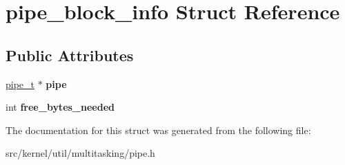 \hypertarget{structpipe__block__info}{}\section{pipe\+\_\+block\+\_\+info Struct Reference}
\label{structpipe__block__info}
\subsection*{Public Attributes}
\begin{DoxyCompactItemize}
\item 
\mbox{\label{structpipe__block__info_a57bc2c6f64fe12c09e9d4c0daa654d6b}} 
\hyperlink{structpipe__t}{pipe\+\_\+t} $\ast$ {\bfseries pipe}
\item 
\mbox{\label{structpipe__block__info_ad99dc801b1c3b09dd2b09ced9fe5f5f2}} 
int {\bfseries free\+\_\+bytes\+\_\+needed}
\end{DoxyCompactItemize}


The documentation for this struct was generated from the following file\+:\begin{DoxyCompactItemize}
\item 
src/kernel/util/multitasking/pipe.\+h\end{DoxyCompactItemize}

